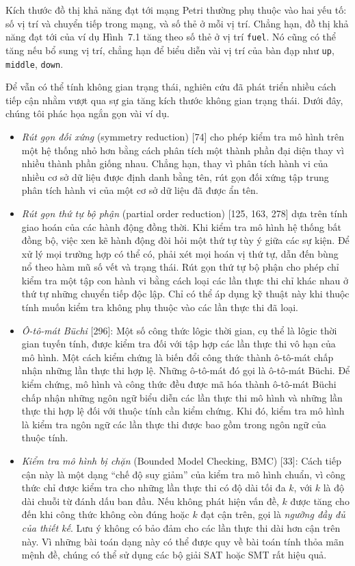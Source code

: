 Kích thước đồ thị khả năng đạt tới mạng Petri thường phụ thuộc vào hai yếu tố: số vị trí và chuyển tiếp trong mạng, và số thẻ ở mỗi vị trí. Chẳng hạn, đồ thị khả năng đạt tới của ví dụ Hình~7.1 tăng theo số thẻ ở vị trí \texttt{fuel}. Nó cũng có thể tăng nếu bổ sung vị trí, chẳng hạn để biểu diễn vài vị trí của bàn đạp như \texttt{up}, \texttt{middle}, \texttt{down}.

Để vẫn có thể tính không gian trạng thái, nghiên cứu đã phát triển nhiều cách tiếp cận nhằm vượt qua sự gia tăng kích thước không gian trạng thái. Dưới đây, chúng tôi phác họa ngắn gọn vài ví dụ.
\begin{itemize}
\item \emph{Rút gọn đối xứng} (symmetry reduction) [74] cho phép kiểm tra mô hình trên một hệ thống nhỏ hơn bằng cách phân tích một thành phần đại diện thay vì nhiều thành phần giống nhau. Chẳng hạn, thay vì phân tích hành vi của nhiều cơ sở dữ liệu được định danh bằng tên, rút gọn đối xứng tập trung phân tích hành vi của một cơ sở dữ liệu đã được ẩn tên.
\item \emph{Rút gọn thứ tự bộ phận} (partial order reduction) [125, 163, 278] dựa trên tính giao hoán của các hành động đồng thời. Khi kiểm tra mô hình hệ thống bất đồng bộ, việc xen kẽ hành động đòi hỏi một thứ tự tùy ý giữa các sự kiện. Để xử lý mọi trường hợp có thể có, phải xét mọi hoán vị thứ tự, dẫn đến bùng nổ theo hàm mũ số vết và trạng thái. Rút gọn thứ tự bộ phận cho phép chỉ kiểm tra một tập con hành vi bằng cách loại các lần thực thi chỉ khác nhau ở thứ tự những chuyển tiếp độc lập. Chỉ có thể áp dụng kỹ thuật này khi thuộc tính muốn kiểm tra không phụ thuộc vào các lần thực thi đã loại.
\item \emph{Ô-tô-mát Büchi} [296]: Một số công thức lôgic thời gian, cụ thể là lôgic thời gian tuyến tính, được kiểm tra đối với tập hợp các lần thực thi vô hạn của mô hình. Một cách kiểm chứng là biến đổi công thức thành ô-tô-mát chấp nhận những lần thực thi hợp lệ. Những ô-tô-mát đó gọi là ô-tô-mát Büchi. Để
kiểm chứng, mô hình và công thức đều được mã hóa thành ô-tô-mát Büchi chấp nhận những ngôn ngữ biểu diễn các lần thực thi mô hình và những lần thực thi hợp lệ đối với thuộc tính cần kiểm chứng. Khi đó, kiểm tra mô hình là kiểm tra ngôn ngữ các lần thực thi được bao gồm trong ngôn ngữ của thuộc tính.
\item \emph{Kiểm tra mô hình bị chặn} (Bounded Model Checking, BMC) [33]: Cách tiếp cận này là một dạng ``chế độ suy giảm'' của kiểm tra mô hình chuẩn, vì công thức chỉ được kiểm tra cho những lần thực thi có độ dài tối đa $k$, với $k$ là độ dài chuỗi từ đánh dấu ban đầu. Nếu không phát hiện vấn đề, $k$ được tăng cho đến khi công thức không còn đúng hoặc $k$ đạt cận trên, gọi là \emph{ngưỡng đầy đủ của thiết kế}. Lưu ý không có bảo đảm cho các lần thực thi dài hơn cận trên này. Vì những bài toán dạng này có thể được quy về bài toán tính thỏa mãn mệnh đề, chúng có thể sử dụng các bộ giải SAT hoặc SMT rất hiệu quả.

\end{itemize}
